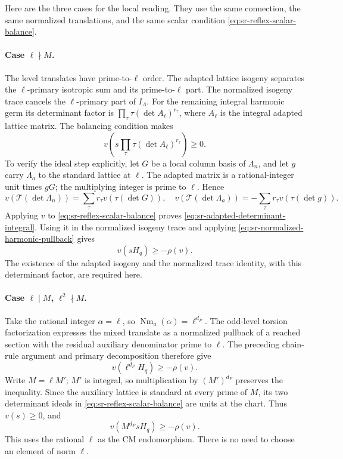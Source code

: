 Here are the three cases for the local reading.
They use the same connection, the same normalized translations,
and the same scalar condition \eqref{eq:sr-reflex-scalar-balance}.

\paragraph{Case \(\ell\nmid M\).}
The level translates have prime-to-\(\ell\) order.
The adapted lattice isogeny separates the \(\ell\)-primary
isotropic sum and its prime-to-\(\ell\) part.
The normalized isogeny trace cancels the
\(\ell\)-primary part of \(I_\Lambda\).
For the remaining integral harmonic germ its determinant factor
is
\(\prod_\tau\tau(\det A_\ell)^{r_\tau}\), where \(A_\ell\)
is the integral adapted lattice matrix.
The balancing condition makes
\begin{equation}\label{eq:sr-adapted-determinant-integral}
 v\left(s\prod_\tau
                  \tau(\det A_\ell)^{r_\tau}\right)\ge0.
\end{equation}
To verify the ideal step explicitly, let \(G\) be a local column
basis of \(\Lambda_n\), and let \(g\) carry
\(\Lambda_a\) to the standard lattice at \(\ell\).
The adapted matrix is a rational-integer unit times \(gG\);
the multiplying integer is prime to \(\ell\).
Hence
\[
 v(\mathcal T(\det\Lambda_n))
       =\sum_\tau r_\tau v(\tau(\det G)),\quad
 v(\mathcal T(\det\Lambda_a))
       =-\sum_\tau r_\tau v(\tau(\det g)).
\]
Applying \(v\) to \eqref{eq:sr-reflex-scalar-balance} proves
\eqref{eq:sr-adapted-determinant-integral}.
Using it in the normalized isogeny trace and applying
\eqref{eq:sr-normalized-harmonic-pullback} gives
\[
                         v(sH_q)\ge-\rho(v).
\]
The existence of the adapted isogeny and the normalized trace
identity, with this determinant factor, are required here.

\paragraph{Case \(\ell\mid M\), \(\ell^2\nmid M\).}
Take the rational integer \(\alpha=\ell\), so
\(\operatorname{Nm}_a(\alpha)=\ell^{d_P}\).
The odd-level torsion factorization expresses the mixed
translate as a normalized pullback of a reached section with
the residual auxiliary denominator prime to \(\ell\).
The preceding chain-rule argument and primary decomposition
therefore give
\[
                         v(\ell^{d_P}H_q)\ge-\rho(v).
\]
Write \(M=\ell M'\); \(M'\) is integral, so multiplication by
\((M')^{d_P}\) preserves the inequality.
Since the auxiliary lattice is standard at every prime of \(M\),
its two determinant ideals in
\eqref{eq:sr-reflex-scalar-balance} are units at the chart.
Thus \(v(s)\ge0\), and
\[
                         v(M^{d_P}sH_q)\ge-\rho(v).
\]
This uses the rational \(\ell\) as the CM endomorphism.
There is no need to choose an element of norm \(\ell\).

